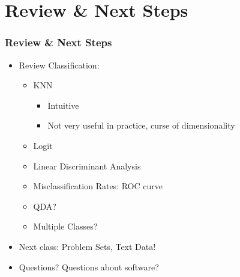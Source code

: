 \documentclass[
  shownotes,
  xcolor={svgnames},
  hyperref={colorlinks,citecolor=DarkBlue,linkcolor=DarkRed,urlcolor=DarkBlue}
  , aspectratio=169]{beamer}
\begin{document}
\section{Review
 \& Next Steps}
\begin{frame}
\frametitle{Review \& Next Steps}
  
\begin{itemize} 
    \item Review Classification:
    \medskip
    \begin{itemize} 
      \item KNN
        \begin{itemize}  
            \item Intuitive
            \item Not very useful in practice, curse of dimensionality
        \end{itemize}      
     \medskip   
    \item Logit
    \medskip
  \item Linear Discriminant Analysis
  \medskip
  \item  Misclassification Rates: ROC curve
  \medskip
  \item QDA?
  \medskip 
  \item Multiple Classes?

    \end{itemize}
    \bigskip  
  \item  Next class:  Problem Sets, Text Data!


\bigskip  
\item Questions? Questions about software? 

\end{itemize}
\end{frame}
\end{document}
